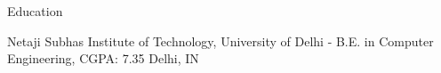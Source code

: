 \documentclass[../resume.tex]{subfiles}
\begin{document}
\begin{rSection}{ Education }

\rSubsectionHeading
    {Netaji Subhas Institute of Technology, \nem University of Delhi}
    {  - }
    {\normalfont B.E. in Computer Engineering, CGPA: 7.35}
    {Delhi, IN}


\end{rSection}
\end{document}
